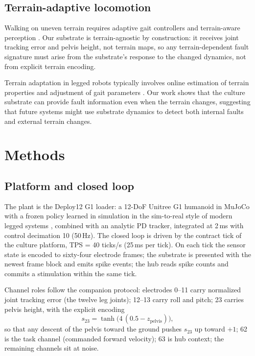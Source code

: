 \subsection{Terrain-adaptive locomotion}

Walking on uneven terrain requires adaptive gait controllers
\cite{kalakrishnan2010, grandia2021} and terrain-aware perception
\cite{fankhauser2018}. Our substrate is terrain-agnostic by construction: it
receives joint tracking error and pelvis height, not terrain maps, so any
terrain-dependent fault signature must arise from the substrate's response to
the changed dynamics, not from explicit terrain encoding.

Terrain adaptation in legged robots typically involves online estimation of
terrain properties and adjustment of gait parameters \cite{kalakrishnan2010}.
Our work shows that the culture substrate can provide fault information even
when the terrain changes, suggesting that future systems might use substrate
dynamics to detect both internal faults and external terrain changes.

\section{Methods}

\subsection{Platform and closed loop}

The plant is the Deploy12 G1 loader: a 12-DoF Unitree G1 humanoid in MuJoCo
\cite{todorov2012} with a frozen policy learned in simulation in the
sim-to-real style of modern legged systems \cite{hwangbo2019}, combined with
an analytic PD tracker, integrated at 2\,ms with control decimation 10
(50\,Hz). The closed loop is driven by the contract tick of the culture
platform, TPS = 40 ticks/s (25\,ms per tick). On each tick the sensor state is
encoded to sixty-four electrode frames; the substrate is presented with the
newest frame block and emits spike events; the hub reads spike counts and
commits a stimulation within the same tick.

Channel roles follow the companion protocol: electrodes 0--11 carry normalized
joint tracking error (the twelve leg joints); 12--13 carry roll and pitch; 23
carries pelvis height, with the explicit encoding
\begin{equation}
s_{23} = \tanh\!\bigl(4\,(0.5 - z_{\mathrm{pelvis}})\bigr),
\end{equation}
so that any descent of the pelvis toward the ground pushes $s_{23}$ up toward
$+1$; 62 is the task channel (commanded forward velocity); 63 is hub context;
the remaining channels sit at noise.

